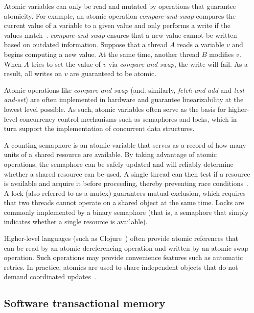\documentclass{sig-alternate}
\begin{document}
Atomic variables can only be read and mutated by operations that guarantee atomicity. For example, an atomic operation \emph{compare-and-swap} compares the current value of a variable to a given value and only performs a write if the values match~\cite{Swalens2014}. \emph{compare-and-swap} ensures that a new value cannot be written based on outdated information. Suppose that a thread $A$ reads a variable $v$ and begins computing a new value. At the same time, another thread $B$ modifies $v$. When $A$ tries to set the value of $v$ via \emph{compare-and-swap}, the write will fail. As a result, all writes on $v$ are guaranteed to be atomic.

Atomic operations like \emph{compare-and-swap} (and, similarly, \emph{fetch-and-add} and \emph{test-and-set}) are often implemented in hardware and guarantee linearizability at the lowest level possible. As such, atomic variables often serve as the basis for higher-level concurrency control mechanisms such as semaphores and locks, which in turn support the implementation of concurrent data structures.

A counting semaphore is an atomic variable that serves as a record of how many units of a shared resource are available. By taking advantage of atomic operations, the semaphore can be safely updated and will reliably determine whether a shared resource can be used. A single thread can then test if a resource is available and acquire it before proceeding, thereby preventing race conditions~\cite{Swalens2014}. A lock (also referred to as a mutex) guarantees mutual exclusion, which requires that two threads cannot operate on a shared object at the same time. Locks are commonly implemented by a binary semaphore (that is, a semaphore that simply indicates whether a single resource is available).

Higher-level languages (such as Clojure~\cite{Swalens2014}) often provide atomic references that can be read by an atomic dereferencing operation and written by an atomic swap operation. Such operations may provide convenience features such as automatic retries. In practice, atomics are used to share independent objects that do not demand coordinated updates~\cite{Swalens2014}.

\subsection{Software transactional memory}
\end{document}

